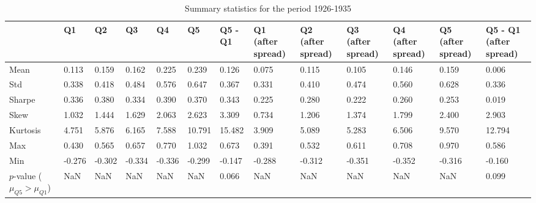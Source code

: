 \begin{table}
\caption{Summary statistics for the period 1926-1935}
\label{tab:summary_1926_1935}
\begin{tabular}{lllllllllllll}
\toprule
 & Q1 & Q2 & Q3 & Q4 & Q5 & Q5 - Q1 & Q1 (after spread) & Q2 (after spread) & Q3 (after spread) & Q4 (after spread) & Q5 (after spread) & Q5 - Q1 (after spread) \\
\midrule
Mean & 0.113 & 0.159 & 0.162 & 0.225 & 0.239 & 0.126 & 0.075 & 0.115 & 0.105 & 0.146 & 0.159 & 0.006 \\
Std & 0.338 & 0.418 & 0.484 & 0.576 & 0.647 & 0.367 & 0.331 & 0.410 & 0.474 & 0.560 & 0.628 & 0.336 \\
Sharpe & 0.336 & 0.380 & 0.334 & 0.390 & 0.370 & 0.343 & 0.225 & 0.280 & 0.222 & 0.260 & 0.253 & 0.019 \\
Skew & 1.032 & 1.444 & 1.629 & 2.063 & 2.623 & 3.309 & 0.734 & 1.206 & 1.374 & 1.799 & 2.400 & 2.903 \\
Kurtosis & 4.751 & 5.876 & 6.165 & 7.588 & 10.791 & 15.482 & 3.909 & 5.089 & 5.283 & 6.506 & 9.570 & 12.794 \\
Max & 0.430 & 0.565 & 0.657 & 0.770 & 1.032 & 0.673 & 0.391 & 0.532 & 0.611 & 0.708 & 0.970 & 0.586 \\
Min & -0.276 & -0.302 & -0.334 & -0.336 & -0.299 & -0.147 & -0.288 & -0.312 & -0.351 & -0.352 & -0.316 & -0.160 \\
$p$-value ($\mu_{Q5} > \mu_{Q1}$) & NaN & NaN & NaN & NaN & NaN & 0.066 & NaN & NaN & NaN & NaN & NaN & 0.099 \\
\bottomrule
\end{tabular}
\end{table}
